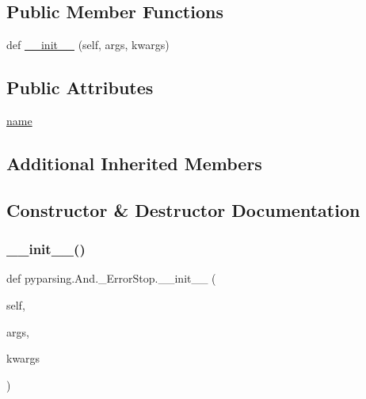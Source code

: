 \subsection*{Public Member Functions}
\begin{DoxyCompactItemize}
\item 
def \hyperlink{classpyparsing_1_1And_1_1__ErrorStop_a1c9762847a3d8260078f13412eb094ea}{\+\_\+\+\_\+init\+\_\+\+\_\+} (self, args, kwargs)
\end{DoxyCompactItemize}
\subsection*{Public Attributes}
\begin{DoxyCompactItemize}
\item 
\hyperlink{classpyparsing_1_1And_1_1__ErrorStop_ad8f8fbf8ad06bb536844da76737b7df5}{name}
\end{DoxyCompactItemize}
\subsection*{Additional Inherited Members}


\subsection{Constructor \& Destructor Documentation}
\mbox{\label{classpyparsing_1_1And_1_1__ErrorStop_a1c9762847a3d8260078f13412eb094ea}} 
\subsubsection{\texorpdfstring{\+\_\+\+\_\+init\+\_\+\+\_\+()}{\_\_init\_\_()}}
{\footnotesize\ttfamily def pyparsing.\+And.\+\_\+\+Error\+Stop.\+\_\+\+\_\+init\+\_\+\+\_\+ (\begin{DoxyParamCaption}\item[{}]{self,  }\item[{}]{args,  }\item[{}]{kwargs }\end{DoxyParamCaption})}



